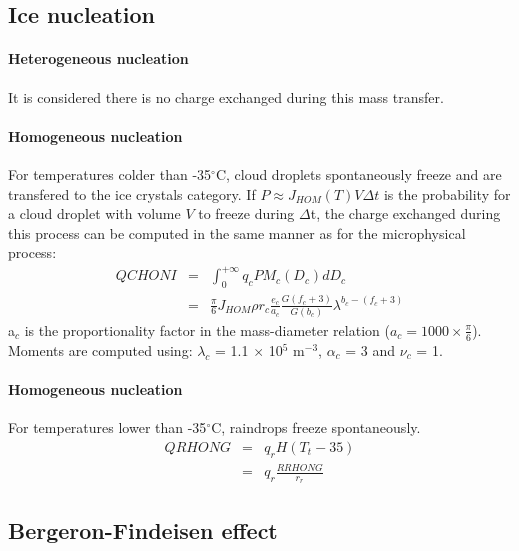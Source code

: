 \subsection{Ice nucleation}

\paragraph{Heterogeneous nucleation}

It is considered there is no charge exchanged during this mass transfer.


\paragraph{Homogeneous nucleation}

For temperatures colder than -35$^{\circ}$C, cloud droplets spontaneously freeze and are transfered to the ice crystals category.
If $P \approx J_{HOM}(T) V \Delta t$ is the probability for a cloud droplet with volume $V$ to freeze during $\Delta$t, the charge exchanged during this process can be computed in the same manner as for the microphysical process:
\begin{eqnarray}
  QCHONI & = & \int_0 ^{+ \infty} q_c P M_c (D_c) dD_c \nonumber \\
         & = & \frac{\pi}{6} J_{HOM} \rho r_c \frac{e_c}{a_c} \frac{G(f_c + 3)}{G(b_c)} \lambda ^{b_c - (f_c + 3)}
\end{eqnarray}
a$_{c}$ is the proportionality factor in the mass-diameter relation ($a_c = 1000 \times \frac{\pi}{6}$). 
Moments are computed using: $\lambda _{c}$ = 1.1 $\times$ 10$^{5}$ m$^{-3}$, $\alpha _{c}$ = 3 and $\nu _{c}$ = 1.


\paragraph{Homogeneous nucleation}

For temperatures lower than -35$^{\circ}$C, raindrops freeze spontaneously.
\begin{eqnarray}
  QRHONG & = & q_r H(T_t - 35) \nonumber \\
         & = & q_r \frac{RRHONG}{r_r}
\end{eqnarray}

\subsection{Bergeron-Findeisen effect}

